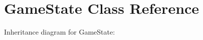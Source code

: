 \hypertarget{class_game_state}{}\section{Game\+State Class Reference}
\label{class_game_state}


Inheritance diagram for Game\+State\+:
